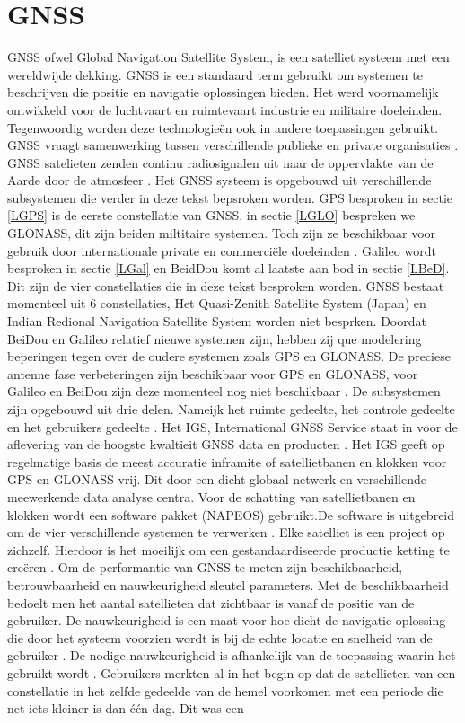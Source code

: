 \section{GNSS}
\label{LGNS}
GNSS ofwel Global Navigation Satellite System, is een satelliet systeem met een wereldwijde dekking. GNSS is een standaard term gebruikt om systemen te beschrijven die positie en navigatie oplossingen bieden. Het werd voornamelijk ontwikkeld voor de luchtvaart en ruimtevaart industrie en militaire doeleinden. Tegenwoordig worden deze technologie\"en ook in andere toepassingen gebruikt. GNSS vraagt samenwerking tussen verschillende publieke en private organisaties \cite{LBibGNSS3}. GNSS satelieten zenden continu radiosignalen uit naar de oppervlakte van de Aarde door de atmosfeer \cite{LBibGPS4}. Het GNSS systeem is opgebouwd uit verschillende subsystemen die verder in deze tekst bepsroken worden. GPS besproken in sectie \ref{LGPS} is de eerste constellatie van GNSS, in sectie \ref{LGLO} bespreken we GLONASS, dit zijn beiden miltitaire systemen. Toch zijn ze beschikbaar voor gebruik door internationale private en commerci\"ele doeleinden \cite{LBibGNSS8}. Galileo wordt besproken in sectie \ref{LGal} en BeidDou komt al laatste aan bod in sectie \ref{LBeD}. Dit zijn de vier constellaties die in deze tekst besproken worden. GNSS bestaat momenteel uit 6 constellaties, Het Quasi-Zenith Satellite System (Japan) en Indian Redional Navigation Satellite System worden niet besprken. Doordat BeiDou en Galileo relatief nieuwe systemen zijn, hebben zij que modelering beperingen tegen over de oudere systemen zoals GPS en GLONASS. De preciese antenne fase verbeteringen zijn beschikbaar voor GPS en GLONASS, voor Galileo en BeiDou zijn deze momenteel nog niet beschikbaar \cite{LBibPPP2}. De subsystemen zijn opgebouwd uit drie delen. Nameijk het ruimte gedeelte, het controle gedeelte en het gebruikers gedeelte \cite{LBibBeiDou2}.  Het IGS, International GNSS Service staat in voor de aflevering van de hoogste kwaltieit GNSS data en producten \cite{LBibGNSS}. Het IGS geeft op regelmatige basis de meest accuratie inframite of satellietbanen en klokken voor GPS en GLONASS vrij. Dit door een dicht globaal netwerk en verschillende meewerkende data analyse centra. Voor de schatting van satellietbanen en klokken wordt een software pakket (NAPEOS) gebruikt.De software is uitgebreid om de vier verschillende systemen te verwerken \cite{LBibPPP2}.  Elke satelliet is een project op zichzelf. Hierdoor is het moeilijk om een gestandaardiseerde productie ketting te creëren \cite{LBibGNSS3}. Om de performantie van GNSS te meten zijn beschikbaarheid, betrouwbaarheid en nauwkeurigheid sleutel parameters. Met de beschikbaarheid bedoelt men het aantal satellieten dat zichtbaar is vanaf de positie van de gebruiker. De nauwkeurigheid is een maat voor hoe dicht de navigatie oplossing die door het systeem voorzien wordt is bij de echte locatie en snelheid van de gebruiker \cite{LBibGNSS6}. De nodige nauwkeurigheid is afhankelijk van de toepassing waarin het gebruikt wordt \cite{LBibRTK3}. Gebruikers merkten al in het begin op dat de satellieten van een constellatie in het zelfde gedeelde van de hemel voorkomen met een periode die net iets kleiner is dan \'e\'en dag. Dit was een 